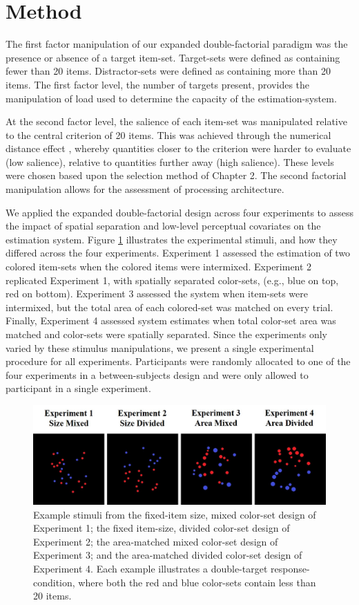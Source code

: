\section{Method}
The first factor manipulation of our expanded double-factorial paradigm was the presence or absence of a target item-set. Target-sets were defined as containing fewer than 20 items. Distractor-sets were defined as containing more than 20 items. The first factor level, the number of targets present, provides the manipulation of load used to determine the capacity of the estimation-system.

At the second factor level, the salience of each item-set was manipulated relative to the central criterion of 20 items. This was achieved through the numerical distance effect \cite{buckley1974comparisons}, whereby quantities closer to the criterion were harder to evaluate (low salience), relative to quantities further away (high salience). These levels were chosen based upon the selection method of Chapter 2. The second factorial manipulation allows for the assessment of processing architecture.

We applied the expanded double-factorial design across four experiments to assess the impact of spatial separation and low-level perceptual covariates on the estimation system. Figure \ref{fig:ExpStim} illustrates the experimental stimuli, and how they differed across the four experiments. Experiment 1 assessed the estimation of two colored item-sets when the colored items were intermixed. Experiment 2 replicated Experiment 1, with spatially separated color-sets, (e.g., blue on top, red on bottom). Experiment 3 assessed the system when item-sets were intermixed, but the total area of each colored-set was matched on every trial. Finally, Experiment 4 assessed system estimates when total color-set area was matched and color-sets were spatially separated. Since the experiments only varied by these stimulus manipulations, we present a single experimental procedure for all experiments. Participants were randomly allocated to one of the four experiments in a between-subjects design and were only allowed to participant in a single experiment.

\begin{figure}[htb]
\centering \includegraphics[scale = .45]{Figures/EstSystems/FIG4JPG.jpg}
\caption{Example stimuli from the fixed-item size, mixed color-set design of Experiment 1; the fixed item-size, divided color-set design of Experiment 2; the area-matched mixed color-set design of Experiment 3; and the area-matched divided color-set design of Experiment 4. Each example illustrates a double-target response-condition, where both the red and blue color-sets contain less than 20 items.}
\label{fig:ExpStim}
\end{figure}

